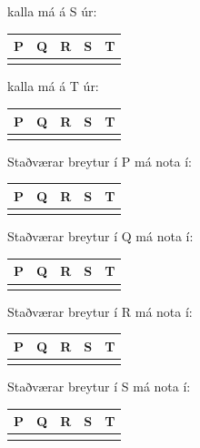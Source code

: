 \documentclass{article}
\begin{document}
     kalla má á S úr:

     
     \begin{tabularx}{\textwidth}{ |X|X|X|X|X|}
        \hline
        \textbf{P}  & \textbf{Q}  & \textbf{R}  & \textbf{S}  & \textbf{T} \\ \hline
         & & & & \\ \hline
     \end{tabularx}

     kalla má á T úr:

     
     \begin{tabularx}{\textwidth}{ |X|X|X|X|X|}
        \hline
        \textbf{P}  & \textbf{Q}  & \textbf{R}  & \textbf{S}  & \textbf{T} \\ \hline
         & & & & \\ \hline
     \end{tabularx}

     Staðværar breytur í P má nota í:

     
     \begin{tabularx}{\textwidth}{ |X|X|X|X|X|}
        \hline
        \textbf{P}  & \textbf{Q}  & \textbf{R}  & \textbf{S}  & \textbf{T} \\ \hline
         & & & & \\ \hline
     \end{tabularx}


     Staðværar breytur í Q má nota í:

     
     \begin{tabularx}{\textwidth}{ |X|X|X|X|X|}
        \hline
        \textbf{P}  & \textbf{Q}  & \textbf{R}  & \textbf{S}  & \textbf{T} \\ \hline
         & & & & \\ \hline
     \end{tabularx}


     Staðværar breytur í R má nota í:

     
     \begin{tabularx}{\textwidth}{ |X|X|X|X|X|}
        \hline
        \textbf{P}  & \textbf{Q}  & \textbf{R}  & \textbf{S}  & \textbf{T} \\ \hline
         & & & & \\ \hline
     \end{tabularx}



     Staðværar breytur í S má nota í:

     
     \begin{tabularx}{\textwidth}{ |X|X|X|X|X|}
        \hline
        \textbf{P}  & \textbf{Q}  & \textbf{R}  & \textbf{S}  & \textbf{T} \\ \hline
         & & & & \\ \hline
     \end{tabularx}
\end{document}
